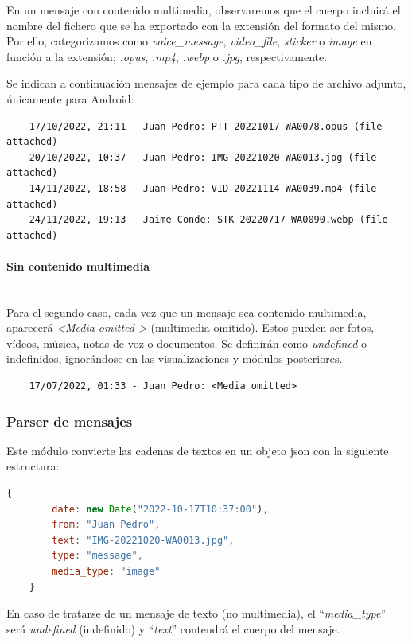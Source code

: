 En un mensaje con contenido multimedia, observaremos que el cuerpo incluirá el nombre del fichero que se ha exportado con la extensión del formato del mismo. Por ello, categorizamos como \textit{voice\_message}, \textit{video\_file}, \textit{sticker} o \textit{image} en función a la extensión; \textit{.opus}, \textit{.mp4}, \textit{.webp} o \textit{.jpg}, respectivamente.

Se indican a continuación mensajes de ejemplo para cada tipo de archivo adjunto, únicamente para Android:

\begin{lstlisting}
	17/10/2022, 21:11 - Juan Pedro: PTT-20221017-WA0078.opus (file attached)
	20/10/2022, 10:37 - Juan Pedro: IMG-20221020-WA0013.jpg (file attached)
	14/11/2022, 18:58 - Juan Pedro: VID-20221114-WA0039.mp4 (file attached)
	24/11/2022, 19:13 - Jaime Conde: STK-20220717-WA0090.webp (file attached)
\end{lstlisting}

\paragraph{Sin contenido multimedia}\mbox{}\\

Para el segundo caso, cada vez que un mensaje sea contenido multimedia, aparecerá \textit{\textless Media omitted \textgreater} (multimedia omitido). Estos pueden ser fotos, vídeos, música, notas de voz o documentos. Se definirán como \textit{undefined} o indefinidos, ignorándose en las visualizaciones y módulos posteriores.

\begin{lstlisting}
	17/07/2022, 01:33 - Juan Pedro: <Media omitted>
\end{lstlisting}

\subsubsection{Parser de mensajes}

Este módulo convierte las cadenas de textos en un objeto \acrshort{json} con la siguiente estructura:

\begin{lstlisting}[language=JavaScript]
	{
		date: new Date("2022-10-17T10:37:00"),
		from: "Juan Pedro",
		text: "IMG-20221020-WA0013.jpg",
		type: "message",
		media_type: "image"
	}
\end{lstlisting}

En caso de tratarse de un mensaje de texto (no multimedia), el ``\textit{media\_type}'' será \textit{undefined} (indefinido) y ``\textit{text}'' contendrá el cuerpo del mensaje.

